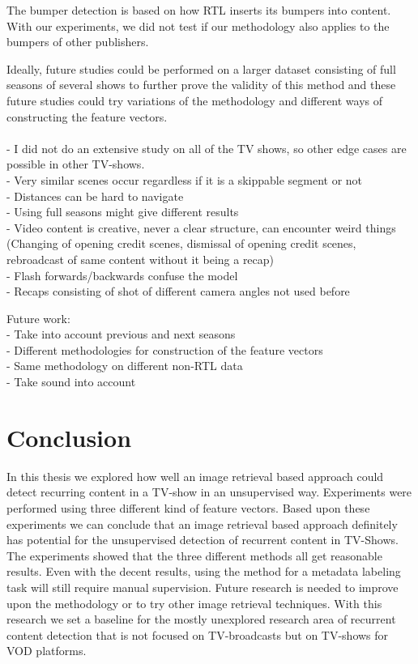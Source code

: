 \documentclass{article}
\begin{document}
The bumper detection is based on how RTL inserts its bumpers into content. With our experiments, we did not test if our methodology also applies to the bumpers of other publishers.

Ideally, future studies could be performed on a larger dataset consisting of full seasons of several shows to further prove the validity of this method and these future studies could try variations of the methodology and different ways of constructing the feature vectors. 
\\
\\
- I did not do an extensive study on all of the TV shows, so other edge cases are possible in other TV-shows.\\
- Very similar scenes occur regardless if it is a skippable segment or not\\
- Distances can be hard to navigate\\
- Using full seasons might give different results\\
- Video content is creative, never a clear structure, can encounter weird things (Changing of opening credit scenes, dismissal of opening credit scenes, rebroadcast of same content without it being a recap)\\
- Flash forwards/backwards confuse the model\\
- Recaps consisting of shot of different camera angles not used before

Future work: \\
- Take into account previous and next seasons\\
- Different methodologies for construction of the feature vectors\\
- Same methodology on different non-RTL data\\
- Take sound into account

\section{Conclusion}
In this thesis we explored how well an image retrieval based approach could detect recurring content in a TV-show in an unsupervised way. Experiments were performed using three different kind of feature vectors. Based upon these experiments we can conclude that an image retrieval based approach definitely has potential for the unsupervised detection of recurrent content in TV-Shows. The experiments showed that the three different methods all get reasonable results. Even with the decent results, using the method for a metadata labeling task will still require manual supervision. Future research is needed to improve upon the methodology or to try other image retrieval techniques. With this research we set a baseline for the mostly unexplored research area of recurrent content detection that is not focused on TV-broadcasts but on TV-shows for VOD platforms. 



\end{document}
